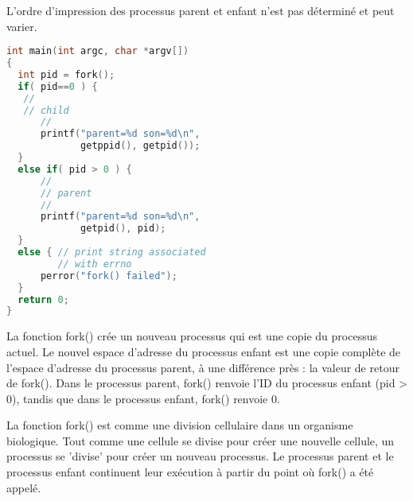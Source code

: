 \documentclass[12pt]{report}
\begin{document}
L'ordre d'impression des processus parent et enfant n'est pas déterminé et peut varier.

\begin{lstlisting}[language=C]
int main(int argc, char *argv[])
{
  int pid = fork();
  if( pid==0 ) { 
   //
   // child
      //
      printf("parent=%d son=%d\n",
             getppid(), getpid());
  }
  else if( pid > 0 ) {
      //
      // parent
      //
      printf("parent=%d son=%d\n",
             getpid(), pid);
  }
  else { // print string associated
         // with errno   
      perror("fork() failed"); 
  }
  return 0;
}
\end{lstlisting}

\begin{tcolorbox}[colback=yellow!5, colframe=yellow!80!black, title={\faBookmark À retenir}]
La fonction fork() crée un nouveau processus qui est une copie du processus actuel. Le nouvel espace d'adresse du processus enfant est une copie complète de l'espace d'adresse du processus parent, à une différence près : la valeur de retour de fork(). Dans le processus parent, fork() renvoie l'ID du processus enfant (pid > 0), tandis que dans le processus enfant, fork() renvoie 0.
\end{tcolorbox}

\begin{tcolorbox}[colback=green!5, colframe=green!75!black, title={\faLightbulb Intuition}]
La fonction fork() est comme une division cellulaire dans un organisme biologique. Tout comme une cellule se divise pour créer une nouvelle cellule, un processus se 'divise' pour créer un nouveau processus. Le processus parent et le processus enfant continuent leur exécution à partir du point où fork() a été appelé.
\end{tcolorbox}
\end{document}
